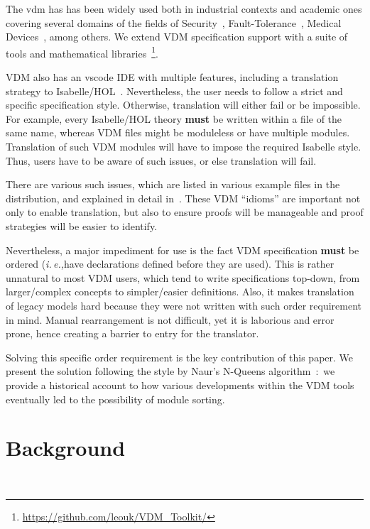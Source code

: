 \documentclass[runningheads,a4paper]{llncs}
\newcommand{\ie}{{\em i.\,e.,\/}}
\begin{document}
The \gls{vdm} has has been widely used both in industrial contexts and academic ones covering several domains of the fields of Security~\cite{Kulik&20,Kulik&21a}, Fault-Tolerance~\cite{Nilsson&18}, Medical Devices~\cite{Macedo&08}, among others. We extend VDM specification support with a suite of tools and mathematical libraries~\footnote{\url{https://github.com/leouk/VDM_Toolkit/}}. 

VDM also has an \gls{vscode} IDE with multiple features, including a translation strategy to Isabelle/HOL~\cite{AdvancedVSCodePaper}. Nevertheless, the user needs to follow a strict and specific specification style. Otherwise, translation will either fail or be impossible. For example, every Isabelle/HOL theory \textbf{must} be written within a file of the same name, whereas VDM files might be moduleless or have multiple modules. Translation of such VDM modules will have to impose the required Isabelle style. Thus, users have to be aware of such issues, or else translation will fail.   

There are various such issues, which are listed in various example files in the distribution, and explained in detail in~\cite{NimFull}. These VDM ``idioms'' are important not only to enable translation, but also to ensure proofs will be manageable and proof strategies will be easier to identify. 

Nevertheless, a major impediment for use is the fact VDM specification \textbf{must} be ordered (\ie have declarations defined before they are used). This is rather unnatural to most VDM users, which tend to write specifications top-down, from larger/complex concepts to simpler/easier definitions. Also, it makes translation of legacy models hard because they were not written with such order requirement in mind. Manual rearrangement is not difficult, yet it is laborious and error prone, hence creating a barrier to entry for the translator. 

Solving this specific order requirement is the key contribution of this paper. We present the solution following the style by Naur's N-Queens algorithm~\cite{NQueens}:~we provide a historical account to how various developments within the VDM tools eventually led to the possibility of module sorting.  

\section{Background}~\label{sec:background}
\end{document}
